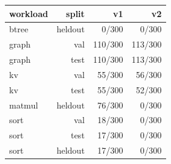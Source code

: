 \begin{tabular}{lrrr}
\toprule
workload & split & v1 & v2 \\
\midrule
btree & heldout & 0/300 & 0/300 \\
graph & val & 110/300 & 113/300 \\
graph & test & 110/300 & 113/300 \\
kv & val & 55/300 & 56/300 \\
kv & test & 55/300 & 52/300 \\
matmul & heldout & 76/300 & 0/300 \\
sort & val & 18/300 & 0/300 \\
sort & test & 17/300 & 0/300 \\
sort & heldout & 17/300 & 0/300 \\
\bottomrule
\end{tabular}
